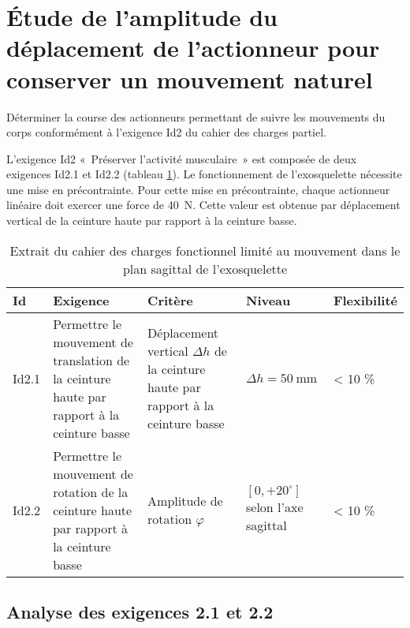 
\section{Étude de l'amplitude du déplacement de l'actionneur pour conserver un mouvement naturel} %
\begin{obj}
Déterminer la course des actionneurs permettant de suivre les mouvements du corps conformément à l'exigence Id2 du cahier des charges partiel.
\end{obj}

\ifprof
\else


L'exigence Id2 «~Préserver l'activité musculaire~» est composée de deux exigences Id2.1 et Id2.2 (tableau \ref{ccs_mp_2023_tab_02}). Le fonctionnement de l'exosquelette nécessite une mise en précontrainte. Pour cette mise en précontrainte, chaque actionneur linéaire doit exercer une force de \SI{40}{N}. Cette valeur est obtenue par déplacement vertical de la ceinture haute par rapport à la ceinture basse.

\begin{table}[h]
\begin{center}
\begin{tabular}{lp{5cm}p{5cm}p{2.5cm}l}
\hline
Id & Exigence & Critère & Niveau & Flexibilité \\
\hline
Id2.1 & Permettre le mouvement de translation de la ceinture haute par rapport à la ceinture basse & Déplacement vertical $\Delta h$ de la ceinture haute par rapport à la ceinture basse & $\Delta h=50 \mathrm{~mm}$ & < 10 \% \\
\hline
Id2.2 & Permettre le mouvement de rotation de la ceinture haute par rapport à la ceinture basse & Amplitude de rotation $\varphi$ &  $[0,+20^{\circ}]$  selon l'axe sagittal & < 10 \% \\
\hline
\end{tabular}
\caption{\label{ccs_mp_2023_tab_02}Extrait du cahier des charges fonctionnel limité au mouvement dans le plan sagittal de l'exosquelette}
\end{center}
\end{table}
\fi

\subsection{Analyse des exigences 2.1 et 2.2} %

